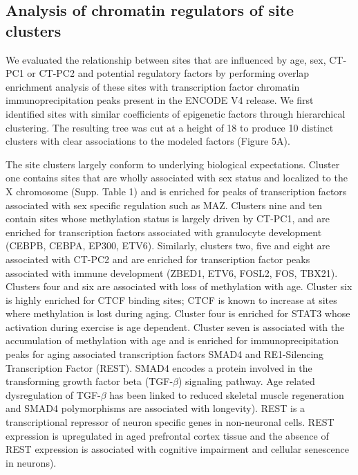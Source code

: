 \documentclass{article}
\begin{document}
{\begin{linenumbers}
\subsection{Analysis of chromatin regulators of site clusters}
We evaluated the relationship between sites that are influenced by age, sex, CT-PC1 or CT-PC2  and potential regulatory 
factors by performing overlap enrichment analysis of these sites with transcription factor chromatin immunoprecipitation 
peaks present in the ENCODE V4\cite{Davis2018-ha,ENCODE_Project_Consortium2012-oe} release. 
We first identified sites with similar coefficients of epigenetic factors through hierarchical clustering. 
The resulting tree was cut at a height of 18 to produce 10 distinct clusters with clear associations to the modeled factors (Figure 5A). 

The site clusters largely conform to underlying biological expectations. Cluster one contains sites 
that are wholly associated with sex status and localized to the X chromosome (Supp. Table 1) and is enriched for peaks of 
transcription factors associated with sex specific regulation such as MAZ\cite{Lopes-Ramos2020-ex}. 
Clusters nine and ten contain sites whose methylation status is largely driven by CT-PC1, and are enriched for 
transcription factors associated with granulocyte development (CEBPB, CEBPA, EP300, ETV6)\cite{Theilgaard-Monch2022-zw,Guerzoni2006-ii}. 
Similarly, clusters two, five and eight are associated with CT-PC2 and are enriched for 
transcription factor peaks associated with immune development (ZBED1, ETV6, FOSL2, FOS, TBX21). Clusters four and 
six are associated with loss of methylation with age. Cluster six is highly enriched for CTCF binding sites; CTCF 
is known to increase at sites where methylation is lost during aging\cite{Tharakan2020-pj}. Cluster four is enriched 
for STAT3 whose activation during exercise is age dependent\cite{Mohamed2020-he,Trenerry2008-kj}.  
Cluster seven is associated with the accumulation of methylation with age and is enriched for immunoprecipitation peaks
 for aging associated transcription factors SMAD4 and RE1-Silencing Transcription Factor (REST). SMAD4 encodes a protein 
 involved in the transforming growth factor beta (TGF-$\beta$) signaling pathway. Age related dysregulation of TGF-$\beta$ 
 has been linked to reduced skeletal muscle regeneration\cite{Carlson2009-uz,Paris2016-fo} and SMAD4 polymorphisms 
 are associated with longevity\cite{Carrieri2004-by}). REST is a transcriptional repressor of neuron specific genes in 
 non-neuronal cells\cite{Chong1995-dj,Coulson2005-pb}. REST expression is upregulated in aged prefrontal cortex 
 tissue and the absence of REST expression is associated with cognitive impairment\cite{Lu2014-dz} and 
 cellular senescence in neurons\cite{Rocchi2021-od}).


\end{linenumbers}}
\end{document}
